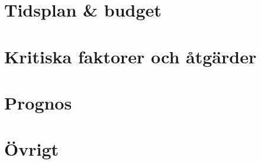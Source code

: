 \section{Tidsplan \& budget}

\section{Kritiska faktorer och åtgärder}

\section{Prognos}

\section{Övrigt}
